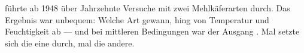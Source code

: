 \begin{geschichte}
 führte ab 1948 über Jahrzehnte Versuche mit zwei Mehlkäferarten durch. Das Ergebnis war unbequem: Welche Art gewann, hing von Temperatur und Feuchtigkeit ab --- und bei mittleren Bedingungen war der Ausgang . Mal setzte sich die eine durch, mal die andere.

\begin{center}
\begin{minipage}{0.9\textwidth}
\end{minipage}
\end{center}
\end{geschichte}

